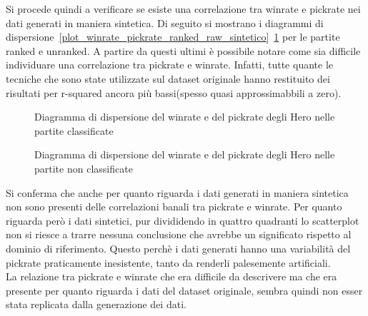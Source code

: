 Si procede quindi a verificare se esiste una correlazione tra winrate e pickrate nei dati generati in maniera sintetica. Di seguito si mostrano i diagrammi di dispersione~\ref{plot_winrate_pickrate_ranked_raw_sintetico}~\ref{plot_winrate_pickrate_unranked_raw_sintetico} per le partite ranked e unranked. A partire da questi ultimi è possibile notare come sia difficile individuare una correlazione tra pickrate e winrate. Infatti, tutte quante le tecniche che sono state utilizzate sul dataset originale hanno restituito dei risultati per r-squared ancora più bassi(spesso quasi approssimabbili a zero). \\ 
\begin{figure}[htbp]
\begin{center}

\caption{Diagramma di dispersione del winrate e del pickrate degli Hero nelle partite classificate}
\label{plot_winrate_pickrate_ranked_raw_sintetico}

\caption{Diagramma di dispersione del winrate e del pickrate degli Hero nelle partite non classificate}
\label{plot_winrate_pickrate_unranked_raw_sintetico}
\end{center}
\end{figure}
Si conferma che anche per quanto riguarda i dati generati in maniera sintetica non sono presenti delle correlazioni banali tra pickrate e winrate. Per quanto riguarda però i dati sintetici, pur divididendo in quattro quadranti lo scatterplot non si riesce a trarre nessuna conclusione che avrebbe un significato rispetto al dominio di riferimento. Questo perchè i dati generati hanno una variabilità del pickrate praticamente inesistente, tanto da renderli palesemente artificiali. \\
La relazione tra pickrate e winrate che era difficile da descrivere ma che era presente per quanto riguarda i dati del dataset originale, sembra quindi non esser stata replicata dalla generazione dei dati. 
